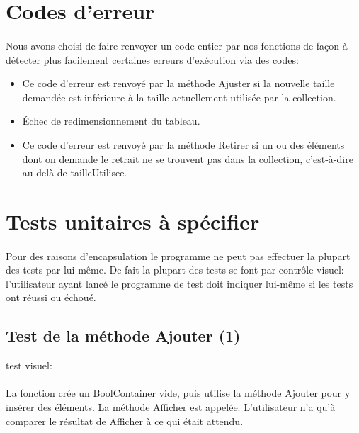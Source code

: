 \documentclass[a4paper, 12pts]{article}
\begin{document}
\section{Codes d'erreur}
\paragraph{}
Nous avons choisi de faire renvoyer un code entier par nos fonctions de façon à détecter plus facilement certaines erreurs d’exécution via des codes:
\begin{itemize}
	\item 
Ce code d’erreur est renvoyé par la méthode Ajuster si la nouvelle taille demandée est inférieure à la taille actuellement utilisée par la collection.
	\item 
Échec de redimensionnement du tableau.
	\item 
Ce code d’erreur est renvoyé par la méthode Retirer si un ou des éléments dont on demande le retrait ne se trouvent pas dans la collection, c’est-à-dire au-delà de tailleUtilisee.
\end{itemize}


\section{Tests unitaires à spécifier}

\paragraph{}
Pour des raisons d'encapsulation le programme ne peut pas effectuer la plupart des tests par lui-même. De fait la plupart des tests se font par contrôle visuel: l'utilisateur ayant lancé le programme de test doit indiquer lui-même si les tests ont réussi ou échoué.

\subsection{Test de la méthode Ajouter (1)}
test visuel:
\paragraph{}
La fonction crée un BoolContainer vide, puis utilise la méthode Ajouter pour y insérer des éléments. La méthode Afficher est appelée. L’utilisateur n’a qu’à comparer le résultat de Afficher à ce qui était attendu.
\end{document}
